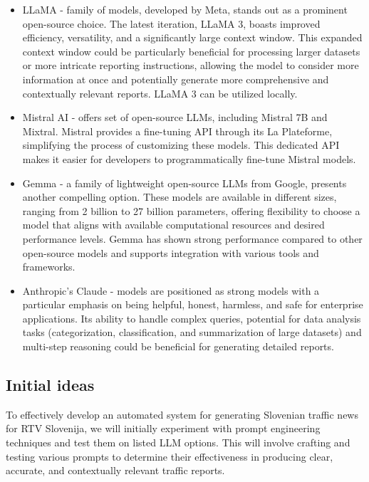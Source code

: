 \documentclass[fleqn,moreauthors,10pt]{ds_report}
\begin{document}
\begin{itemize}
    \item LLaMA - family of models, developed by Meta, stands out as a prominent open-source choice. The latest iteration, LLaMA 3, boasts improved efficiency, versatility, and a significantly large context window. This expanded context window could be particularly beneficial for processing larger datasets or more intricate reporting instructions, allowing the model to consider more information at once and potentially generate more comprehensive and contextually relevant reports. LLaMA 3 can be utilized locally.

    \item Mistral AI - offers set of open-source LLMs, including Mistral 7B and Mixtral. Mistral provides a fine-tuning API through its La Plateforme, simplifying the process of customizing these models. This dedicated API makes it easier for developers to programmatically fine-tune Mistral models.

    \item Gemma - a family of lightweight open-source LLMs from Google, presents another compelling option. These models are available in different sizes, ranging from 2 billion to 27 billion parameters, offering flexibility to choose a model that aligns with available computational resources and desired performance levels. Gemma has shown strong performance compared to other open-source models and supports integration with various tools and frameworks.

    \item Anthropic's Claude - models are positioned as strong models with a particular emphasis on being helpful, honest, harmless, and safe for enterprise applications. Its ability to handle complex queries, potential for data analysis tasks (categorization, classification, and summarization of large datasets) and multi-step reasoning could be beneficial for generating detailed reports.
    
\end{itemize}

\subsection{Initial ideas}

To effectively develop an automated system for generating Slovenian traffic news for RTV Slovenija, we will initially experiment with prompt engineering techniques and test them on listed LLM options. This will involve crafting and testing various prompts to determine their effectiveness in producing clear, accurate, and contextually relevant traffic reports.
\end{document}
